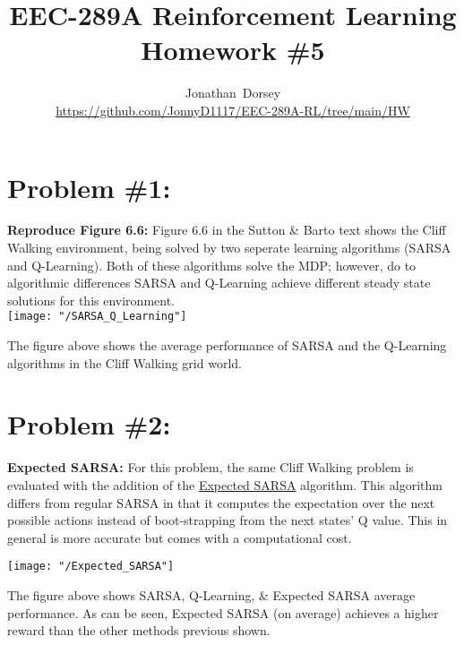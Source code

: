 \documentclass[12pt]{article}
\begin{document}
\title{ EEC-289A Reinforcement Learning \\ Homework \#5 }


\author{Jonathan~Dorsey \\\url{https://github.com/JonnyD1117/EEC-289A-RL/tree/main/HW}}
\maketitle

\section*{Problem \#1: }

\textbf{Reproduce Figure 6.6:} Figure 6.6 in the Sutton \& Barto text shows the Cliff Walking environment, being solved by two seperate learning algorithms (SARSA and Q-Learning). Both of these algorithms solve the MDP; however, do to algorithmic differences SARSA and Q-Learning achieve different steady state solutions for this environment. \\

\texttt{[image: "/SARSA\_Q\_Learning"]}

\noindent The figure above shows the average performance of SARSA and the Q-Learning algorithms in the Cliff Walking grid world.



\section*{Problem \#2: }

\textbf{Expected SARSA:} For this problem, the same Cliff Walking problem is evaluated with the addition of the \underline{Expected SARSA} algorithm. This algorithm differs from regular SARSA in that it computes the expectation over the next possible actions instead of boot-strapping from the next states' Q value. This in general is more accurate but comes with a computational cost.

\texttt{[image: "/Expected\_SARSA"]}

\noindent The figure above shows SARSA, Q-Learning, \& Expected SARSA average performance. As can be seen, Expected SARSA (on average) achieves a higher reward than the other methods previous shown. 
\end{document}
